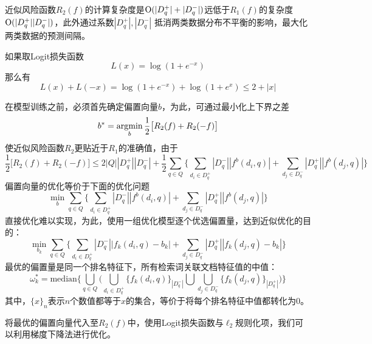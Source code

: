 近似风险函数$R_2(f)$的计算复杂度是$\operatorname{\mathrm{O}}(|D_q^+| + |D_q^-|)$远低于$R_1(f)$的复杂度$\operatorname{\mathrm{O}}(|D_q^+||D_q^-|)$，此外通过系数$|D_q^+|,|D_q^-|$ 抵消两类数据分布不平衡的影响，最大化两类数据的预测间隔。

如果取Logit损失函数
\begin{equation}
    L(x) = \log(1+e^{-x})
\end{equation}
那么有
\[
    L(x) + L(-x) = \log(1+e^{-x}) + \log(1+e^{x}) \le 2 + |x|
\]

在模型训练之前，必须首先确定偏置向量$b$，为此，可通过最小化上下界之差
\begin{equation}
    b^* = \operatorname*{\mathrm{\arg\!\min}}\limits_b \frac{1}{2} \big[ R_2(f) + R_2(-f)\big]
\end{equation}
使近似风险函数$R_2$更贴近于$R_1$的准确值，由于
\begin{equation}
    \frac{1}{2} \big[ R_2(f) + R_2(-f)\big] \le 2|Q||D_q^+||D_q^-| + \frac{1}{2} \sum\limits_{q\in Q} \bigg\{\sum\limits_{d_i\in D_q^+} |D_q^-| |f^b(d_i,q)|  + \sum\limits_{d_j\in D_q^-} |D_q^+| |f^b(d_j,q)|\bigg\}
\end{equation}
偏置向量的优化等价于下面的优化问题
\begin{equation}
    \min\limits_b \sum\limits_{q\in Q} \bigg\{\sum\limits_{d_i\in D_q^+} |D_q^-| |f^b(d_i,q)|  + \sum\limits_{d_j\in D_q^-} |D_q^+| |f^b(d_j,q)|\bigg\}
\end{equation}
直接优化难以实现，为此，使用一组优化模型逐个优选偏置量，达到近似优化的目的：
\begin{equation}
    \min\limits_{b_k} \sum\limits_{q\in Q}\bigg\{\sum\limits_{d_i\in D_q^+} |D_q^-| |f_k(d_i,q) - b_k|  + \sum\limits_{d_j\in D_q^-} |D_q^+| |f_k(d_j,q) - b_k|\bigg\}
\end{equation}
最优的偏置量是同一个排名特征下，所有检索词关联文档特征值的中值：
\begin{equation}
    \omega_k^* = \mathrm{median}\bigg\{\bigcup\limits_{q \in Q} \bigg(\bigcup\limits_{d_i \in D_q^+} \big\{f_k(d_i,q)\big\}_{|D_q^-|} \bigcup \bigcup\limits_{d_j \in D_q^-} \big\{f_k(d_j,q)\big\}_{|D_q^+|} \bigg)\bigg\}
\end{equation}
其中，$\{x\}_n$表示$n$个数值都等于$x$的集合，等价于将每个排名特征中值都转化为0。

将最优的偏置向量代入至$R_2(f)$中，使用Logit损失函数与$\ell_2$规则化项，我们可以利用梯度下降法进行优化。

